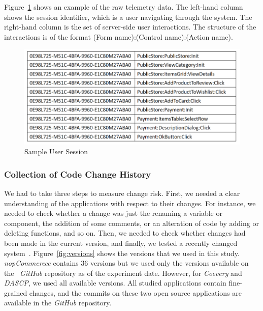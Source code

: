 Figure~\ref{fig:SampleSession3} shows an example of the raw telemetry data. 
The left-hand column shows the session identifier, which is a user
navigating through the system. The right-hand column is the set of server-side user 
interactions. The structure of the interactions is of the format (Form name):(Control name):(Action name).

\begin{figure}[!ht]
\vspace*{-3pt}
	\centering
	\includegraphics[width=0.90\linewidth]{./SessionSample3.png}
	\caption{Sample User Session}
	\label{fig:SampleSession3}
\end{figure}


\subsubsection{Collection of Code Change History}
We had to take three steps to measure change risk. 
First, we needed a clear understanding of the applications with respect to their changes.
For instance, we needed to check whether a change 
was just the renaming a variable or component, the addition of some comments, 
or an alteration of code by adding or deleting functions, and so on. 
Then, we needed to check whether changes had been made in the current version, 
and finally, we tested a recently changed system~\cite{change3}. 
Figure~\ref{fig:versions} shows the versions that we used in this study. 
{\em nopCommerece} contains 36 versions but we used only the
versions available on the ~\textit{GitHub} repository as of the experiment date. However, for
{\em Coevery} and {\em DASCP}, we used all available versions. 
All studied applications contain fine-grained changes, and the commits on these two open source
applications are available in the \textit{GitHub} repository.   

